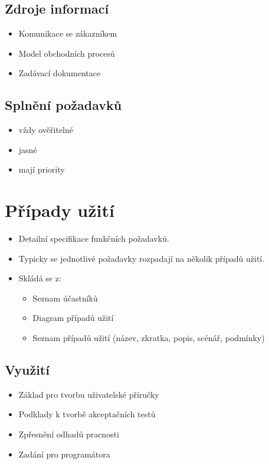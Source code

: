 \documentclass{szzclass}
\begin{document}
\subsection{Zdroje informací}
\begin{itemize}
\item Komunikace se zákazníkem
\item Model obchodních procesů
\item Zadávací dokumentace
\end{itemize}

\subsection{Splnění požadavků}
\begin{itemize}
\item vždy ověřitelné
\item jasné
\item mají priority
\end{itemize}


\section{Případy užití}
\begin{itemize}
\item Detailní specifikace funkčních požadavků.
\item Typicky se jednotlivé požadavky rozpadají na několik případů užití.
\item Skládá se z:
  \begin{itemize}
    \item Seznam účastníků
    \item Diagram případů užití
    \item Seznam případů užití (název, zkratka, popis, scénář, podmínky)
  \end{itemize}
\end{itemize}

\subsection{Využití}
\begin{itemize}
\item Základ pro tvorbu uživatelské příručky
\item Podklady k tvorbě akceptačních testů
\item Zpřesnění odhadů pracnosti
\item Zadání pro programátora
\end{itemize}
\end{document}
